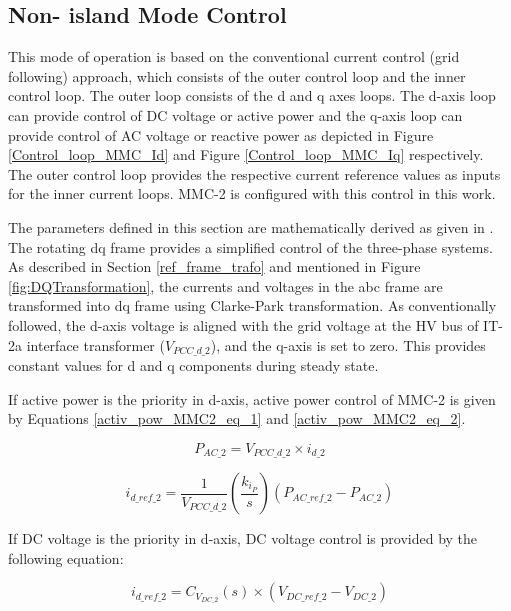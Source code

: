 \subsection{Non- island Mode Control}
This mode of operation is based on the conventional current control (grid following) approach, which consists of the outer control loop and the inner control loop. The outer loop consists of the d and q axes loops. The d-axis loop can provide control of \gls{DC} voltage or active power and the q-axis loop can provide control of \gls{AC} voltage or reactive power as depicted in Figure \ref{Control_loop_MMC_Id} and Figure \ref{Control_loop_MMC_Iq} respectively. The outer control loop provides the respective current reference values as inputs for the inner current loops. \gls{MMC}-2 is configured with this control in this work. 

The parameters defined in this section are mathematically derived as given in \cite{saad2015modelisation}. The rotating \gls{dq} frame provides a simplified control of the three-phase systems. As described in Section \ref{ref_frame_trafo} and mentioned in Figure \ref{fig:DQTransformation}, the currents and voltages in the abc frame are transformed into \gls{dq} frame using Clarke-Park transformation.
As conventionally followed, the d-axis voltage is aligned with the grid voltage at the \gls{HV} bus of IT-2a interface transformer ($V_{PCC\_d\_2}$), and the q-axis is set to zero. This provides constant values for d and q components during steady state.

If active power is the priority in d-axis, active power control of \gls{MMC}-2 is given by Equations \ref{activ_pow_MMC2_eq_1} and \ref{activ_pow_MMC2_eq_2}.

\begin{equation}\label{activ_pow_MMC2_eq_1}
    P_{AC\_2} = V_{PCC\_d\_2} \times i_{d\_2}
\end{equation}

\begin{equation}\label{activ_pow_MMC2_eq_2}
    i_{d\_ref\_2} =  \frac{1}{V_{PCC\_d\_2}} \left(\frac{k_{i_P}}{s}\right)\left(P_{AC\_ref\_2}-P_{AC\_2}\right)
\end{equation}

If \gls{DC} voltage is the priority in d-axis, \gls{DC} voltage control is provided by the following equation:

\begin{equation}
    i_{d\_ref\_2} = C_{V_{DC\_2}}\left(s\right) \times \left(V_{DC\_ref\_2} - V_{DC\_2}\right)
\end{equation}

